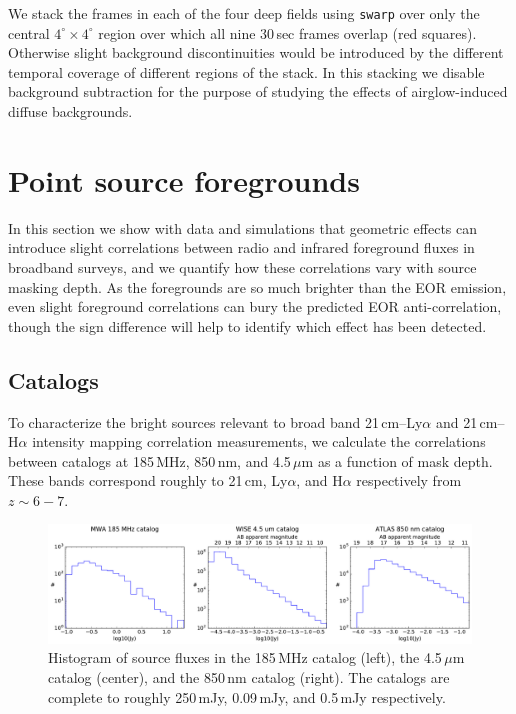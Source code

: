 \documentclass[numberedappendix]{emulateapj}
\begin{document}
We stack the frames in each of the four deep fields using {\tt swarp} over only the central $4^\circ\times 4^\circ$ region over which all nine 30\,sec frames overlap (red squares). Otherwise slight background discontinuities would be introduced by the different temporal coverage of different regions of the stack. In this stacking we disable background subtraction for the purpose of studying the effects of airglow-induced diffuse backgrounds.

\section{Point source foregrounds}
\label{sec:pointsourcefgs}

In this section we show with data and simulations that geometric effects can introduce slight correlations between radio and infrared foreground fluxes in broadband surveys, and we quantify how these correlations vary with source masking depth. As the foregrounds are so much brighter than the EOR emission, even slight foreground correlations can bury the predicted EOR anti-correlation, though the sign difference will help to identify which effect has been detected.

\subsection{Catalogs}
\label{sec:catalogs}

To characterize the bright sources relevant to broad band  21\,cm--Ly$\alpha$ and  21\,cm--H$\alpha$ intensity mapping correlation measurements, we calculate the correlations between catalogs at 185\,MHz, 850\,nm, and 4.5\,$\mu$m as a function of mask depth. These bands correspond roughly to 21\,cm, Ly$\alpha$, and H$\alpha$ respectively from $z\sim6-7$. 

\begin{figure}[t]
\centering
\includegraphics[width=6.5in]{catalog_histograms.pdf}
\caption[Histogram of source fluxes in the 185\,MHz, 850\,nm, and 4.5\,$\mu$m catalogs.]{Histogram of source fluxes in the 185\,MHz catalog (left), the 4.5\,$\mu$m catalog (center), and the 850\,nm catalog (right). The catalogs are complete to roughly 250\,mJy, 0.09\,mJy, and 0.5\,mJy respectively.}
\label{fig:cataloghistograms}
\end{figure}
\end{document}
